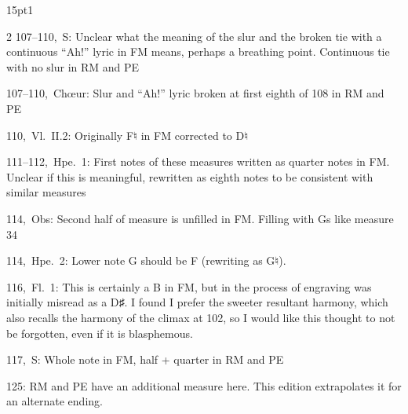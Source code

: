 \documentclass[twoside]{article}
\begin{document}
\begin{hangparas}{15pt}{1}
\begin{multicols}{2}
\mbox{107--110, S}: Unclear what the meaning of the slur and the broken tie with a continuous ``Ah!'' lyric in FM means, perhaps a breathing point. Continuous tie with no slur in RM and PE

\mbox{107--110, Chœur}: Slur and ``Ah!'' lyric broken at first eighth of 108 in RM and PE 

\mbox{110, Vl.~II.2}: Originally F♮ in FM corrected to D♮

\mbox{111--112, Hpe.~1}: First notes of these measures written as quarter notes in FM. Unclear if this is meaningful, rewritten as eighth notes to be consistent with similar measures

\mbox{114, Obs}: Second half of measure is unfilled in FM. Filling with G\scalebox{1.5}{\musDoubleSharp}s like measure 34

\mbox{114, Hpe.~2}: Lower note G\scalebox{1.5}{\musDoubleSharp} should be F\scalebox{1.5}{\musDoubleSharp} (rewriting as G♮).

\mbox{116, Fl.~1}: This is certainly a B in FM, but in the process of engraving was initially misread as a D♯. I found I prefer the sweeter resultant harmony, which also recalls the harmony of the climax at 102, so I would like this thought to not be forgotten, even if it is blasphemous.

\mbox{117, S}: Whole note in FM, half + quarter in RM and PE

\mbox{125}: RM and PE have an additional measure here. This edition extrapolates it for an alternate ending.

\end{multicols}

\end{hangparas}
\end{document}

